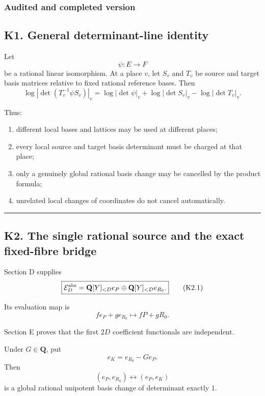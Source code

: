 \documentclass[
  10pt,
  letterpaper,
]{article}
\providecommand{\tightlist}{%
  \setlength{\itemsep}{0pt}\setlength{\parskip}{0pt}}
\theoremstyle{definition}
\theoremstyle{remark}
\begin{document}
\subsubsection{Audited and completed
version}\label{audited-and-completed-version}

\subsection{K1. General determinant-line
identity}\label{k1.-general-determinant-line-identity}

Let \[
\psi:E\longrightarrow F
\] be a rational linear isomorphism. At a place \(v\), let \(S_v\) and
\(T_v\) be source and target basis matrices relative to fixed rational
reference bases. Then \[
\boxed{
\log|\det(T_v^{-1}\psi S_v)|_v
=
\log|\det\psi|_v
+
\log|\det S_v|_v
-
\log|\det T_v|_v.
}
\tag{K1.1}
\]

Thus:

\begin{enumerate}
\def\labelenumi{\arabic{enumi}.}
\tightlist
\item
  different local bases and lattices may be used at different places;
\item
  every local source and target basis determinant must be charged at
  that place;
\item
  only a genuinely global rational basis change may be cancelled by the
  product formula;
\item
  unrelated local changes of coordinates do not cancel automatically.
\end{enumerate}

\begin{center}\rule{0.5\linewidth}{0.5pt}\end{center}

\subsection{K2. The single rational source and the exact fixed-fibre
bridge}\label{k2.-the-single-rational-source-and-the-exact-fixed-fibre-bridge}

Section D supplies \[
\boxed{
\mathcal E_D^{\rm abs}
=
\mathbf Q[Y]_{<D}e_P
\oplus
\mathbf Q[Y]_{<D}e_{R_0}.
}
\tag{K2.1}
\]

Its evaluation map is \[
f e_P+g e_{R_0}\longmapsto fP+gR_0.
\]

Section E proves that the first \(2D\) coefficient functionals are
independent.

Under \(G\in\mathbf Q\), put \[
e_K=e_{R_0}-Ge_P.
\] Then \[
(e_P,e_{R_0})\longleftrightarrow(e_P,e_K)
\] is a global rational unipotent basis change of determinant exactly
\(1\).
\end{document}

